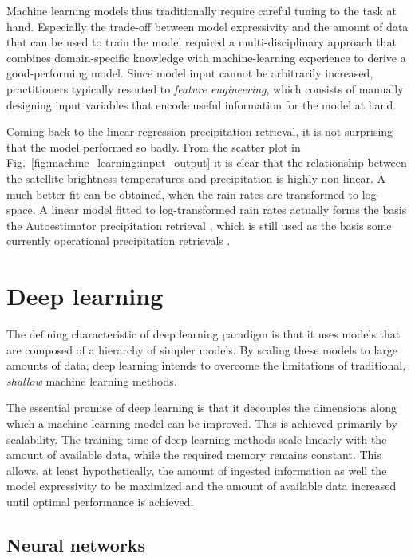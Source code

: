 \begin{description}
Machine learning models thus traditionally require careful tuning to the task at
hand. Especially the trade-off between model expressivity and the amount of data
that can be used to train the model required a multi-disciplinary approach that
combines domain-specific knowledge with machine-learning experience to derive a
good-performing model. Since model input cannot be arbitrarily increased,
practitioners typically resorted to \textit{feature engineering}, which consists
of manually designing input variables that encode useful information for the
model at hand.

Coming back to the linear-regression precipitation retrieval, it is not
surprising that the model performed so badly. From the scatter plot in
Fig.~\ref{fig:machine_learning:input_output} it is clear that the relationship
between the satellite brightness temperatures and precipitation is highly
non-linear. A much better fit can be obtained, when the rain rates are
transformed to log-space. A linear model fitted to log-transformed rain rates
actually forms the basis the Autoestimator precipitation retrieval
\citep{vincente98}, which is still used as the basis some currently operational
precipitation retrievals \citep{siqueira19}.

\section{Deep learning}

The defining characteristic of deep learning paradigm is that it uses models
that are composed of a hierarchy of simpler models. By scaling these models to
large amounts of data, deep learning intends to overcome the limitations of
traditional, \textit{shallow} machine learning methods.

The essential promise of deep learning is that it decouples the dimensions
along which a machine learning model can be improved. This is achieved
primarily by scalability. The training time of deep learning methods scale
linearly with the amount of available data, while the required memory remains
constant. This allows, at least hypothetically, the amount of ingested
information as well the model expressivity to be maximized and the amount of
available data increased until optimal performance is achieved.


  \subsection{Neural networks}


\end{description}
